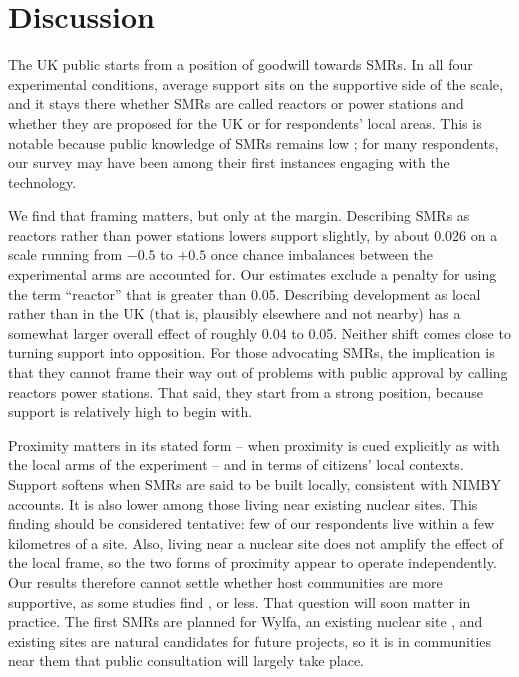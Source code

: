 \documentclass[a4paper, 11pt]{article}
\begin{document}
\section{Discussion}
The UK public starts from a position of goodwill towards SMRs. In all four experimental conditions, average support sits on the supportive side of the scale, and it stays there whether SMRs are called reactors or power stations and whether they are proposed for the UK or for respondents' local areas. This is notable because public knowledge of SMRs remains low \citep{durdovic2025,jones2026}; for many respondents, our survey may have been among their first instances engaging with the technology.

We find that framing matters, but only at the margin. Describing SMRs as reactors rather than power stations lowers support slightly, by about 0.026 on a scale running from $-0.5$ to $+0.5$ once chance imbalances between the experimental arms are accounted for. Our estimates exclude a penalty for using the term ``reactor'' that is greater than 0.05. Describing development as local rather than in the UK (that is, plausibly elsewhere and not nearby) has a somewhat larger overall effect of roughly 0.04 to 0.05. Neither shift comes close to turning support into opposition. For those advocating SMRs, the implication is that they cannot frame their way out of problems with public approval by calling reactors power stations. That said, they start from a strong position, because support is relatively high to begin with.

Proximity matters in its stated form -- when proximity is cued explicitly as with the local arms of the experiment -- and in terms of citizens' local contexts. Support softens when SMRs are said to be built locally, consistent with NIMBY accounts. It is also lower among those living near existing nuclear sites. This finding should be considered tentative: few of our respondents live within a few kilometres of a site. Also, living near a nuclear site does not amplify the effect of the local frame, so the two forms of proximity appear to operate independently. Our results therefore cannot settle whether host communities are more supportive, as some studies find \citep{greenberg2009,mcbeth2023,venables2012}, or less. That question will soon matter in practice. The first SMRs are planned for Wylfa, an existing nuclear site \citep{sutton2025}, and existing sites are natural candidates for future projects, so it is in communities near them that public consultation will largely take place.
\end{document}

